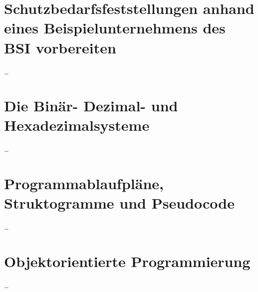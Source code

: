 \documentclass[a4paper, 12pt]{report}
\begin{document}
\section{Schutzbedarfsfeststellungen anhand eines Beispielunternehmens des BSI vorbereiten}
\dots

\section{Die Binär- Dezimal- und Hexadezimalsysteme}
\dots

\section{Programmablaufpläne, Struktogramme und Pseudocode}
\dots

\section{Objektorientierte Programmierung}
\dots
\end{document}
